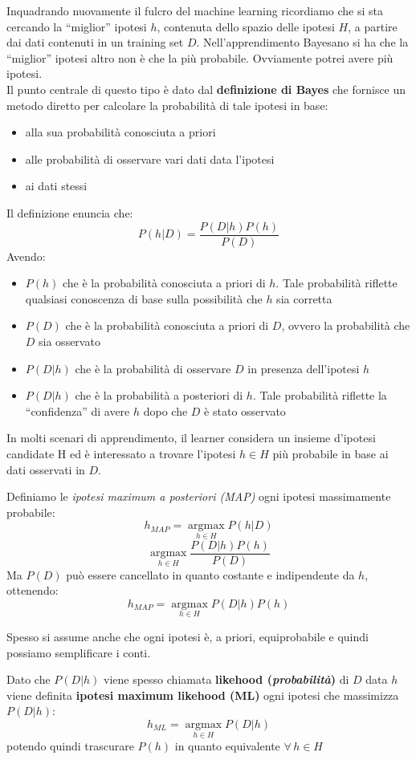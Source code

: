 Inquadrando nuovamente il fulcro del machine learning ricordiamo che si sta
cercando la ``miglior'' ipotesi $h$, contenuta dello spazio delle ipotesi $H$, a
partire dai dati contenuti in un training set $D$. Nell'apprendimento Bayesano
si ha che la ``miglior'' ipotesi altro non è che la più probabile. Ovviamente
potrei avere più ipotesi.\\
Il punto centrale di questo tipo è dato dal \textbf{definizione di Bayes} che
fornisce un metodo diretto per calcolare la probabilità di tale ipotesi in base:
\begin{itemize}
  \item alla sua probabilità conosciuta a priori
  \item alle probabilità di osservare vari dati data l'ipotesi
  \item ai dati stessi
\end{itemize}
\begin{definizione}
  Il definizione enuncia che:
  \[P(h|D)=\frac{P(D|h)P(h)}{P(D)}\]
  Avendo:
  \begin{itemize}
    \item $P(h)$ che è la probabilità conosciuta a priori di $h$. Tale
    probabilità riflette qualsiasi conoscenza di base sulla possibilità
    che $h$ sia corretta  
    \item $P(D)$ che è la probabilità conosciuta a priori di $D$, ovvero la
    probabilità che $D$ sia osservato
    \item $P(D|h)$ che è la probabilità di osservare $D$ in presenza
    dell'ipotesi $h$
    \item $P(D|h)$ che è la probabilità a posteriori di $h$. Tale probabilità
    riflette la ``confidenza'' di avere $h$  dopo che $D$ è stato osservato
  \end{itemize}
\end{definizione}
In molti scenari di apprendimento, il learner considera un insieme d'ipotesi
candidate H ed è interessato a trovare l'ipotesi $h\in H$ più probabile in base
ai dati osservati in $D$.
\begin{definizione}
  Definiamo le \textit{ipotesi maximum a posteriori (MAP)} ogni ipotesi
  massimamente probabile:
  \[h_{MAP}=\operatorname*{argmax}_{h\in H}P(h|D)\]
  \[\operatorname*{argmax}_{h\in H}\frac{P(D|h)P(h)}{P(D)}\]
  Ma $P(D)$ può essere cancellato in quanto costante e indipendente da $h$,
  ottenendo:
  \[h_{MAP}=\operatorname*{argmax}_{h\in H}P(D|h)P(h)\]
\end{definizione}
Spesso si assume anche che ogni ipotesi è, a priori, equiprobabile e quindi
possiamo semplificare i conti.
\begin{definizione}
  Dato che $P(D|h)$ viene spesso chiamata \textbf{likehood
    (\textit{probabilità})} di $D$ data $h$ viene definita \textbf{ipotesi
    maximum likehood (ML)} ogni ipotesi che massimizza $P(D|h)$:
  \[h_{ML}=\operatorname*{argmax}_{h\in H}P(D|h)\]
  potendo quindi trascurare $P(h)$ in quanto equivalente $\forall\, h\in H$
\end{definizione}

